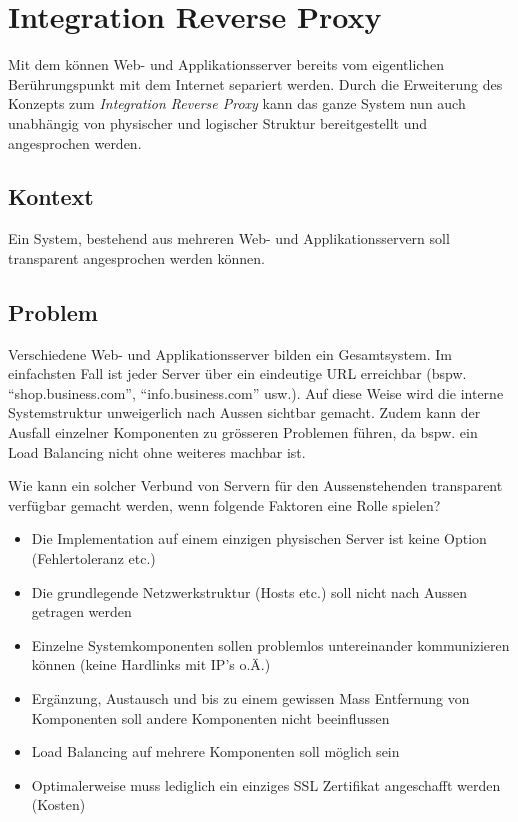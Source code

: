 \section{Integration Reverse Proxy}
\label{sec:integration-reverse-proxy}

Mit dem  können Web- und Applikationsserver bereits vom eigentlichen Berührungspunkt mit dem Internet separiert werden. Durch die Erweiterung des Konzepts zum \emph{Integration Reverse Proxy} kann das ganze System nun auch unabhängig von physischer und logischer Struktur bereitgestellt und angesprochen werden.

\subsection*{Kontext}
Ein System, bestehend aus mehreren Web- und Applikationsservern soll transparent angesprochen werden können.

\subsection*{Problem}
Verschiedene Web- und Applikationsserver bilden ein Gesamtsystem. Im einfachsten Fall ist jeder Server über ein eindeutige URL erreichbar (bspw. ``shop.business.com'', ``info.business.com'' usw.). Auf diese Weise wird die interne Systemstruktur unweigerlich nach Aussen sichtbar gemacht. Zudem kann der Ausfall einzelner Komponenten zu grösseren Problemen führen, da bspw. ein Load Balancing nicht ohne weiteres machbar ist.

Wie kann ein solcher Verbund von Servern für den Aussenstehenden transparent verfügbar gemacht werden, wenn folgende Faktoren eine Rolle spielen?

\begin{itemize}
	\item Die Implementation auf einem einzigen physischen Server ist keine Option (Fehlertoleranz etc.)
	\item Die grundlegende Netzwerkstruktur (Hosts etc.) soll nicht nach Aussen getragen werden
	\item Einzelne Systemkomponenten sollen problemlos untereinander kommunizieren können (keine Hardlinks mit IP's o.Ä.)
	\item Ergänzung, Austausch und bis zu einem gewissen Mass Entfernung von Komponenten soll andere Komponenten nicht beeinflussen
	\item Load Balancing auf mehrere Komponenten soll möglich sein
	\item Optimalerweise muss lediglich ein einziges SSL Zertifikat angeschafft werden (Kosten)
\end{itemize}

